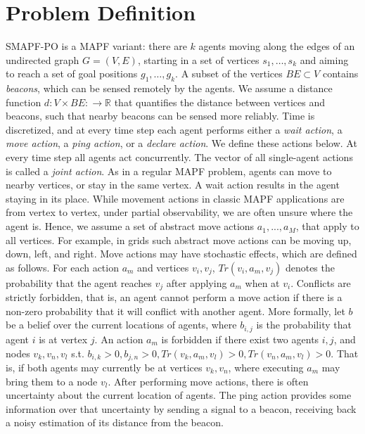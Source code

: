 \documentclass[letterpaper]{article} %
\begin{document}
\section{Problem Definition}
SMAPF-PO is a MAPF variant: there are $k$ agents moving along the edges of an undirected graph $G=(V,E)$, starting in a set of vertices $s_1,\ldots, s_k$ and
aiming to reach a set of goal positions $g_1,\ldots, g_k$.
A subset of the vertices $BE\subset V$ contains \emph{beacons}, which can be sensed remotely by the agents.
We assume a distance function $d:V\times BE:\rightarrow\mathbb{R}$ that quantifies the distance between vertices and beacons, such that nearby beacons can be sensed more reliably. Time is discretized, and at every time step each agent performs either a \emph{wait action}, a \emph{move action}, a \emph{ping action}, or a \emph{declare action}. We define these actions below.
At every time step all agents act concurrently. The vector of all single-agent actions is called a \emph{joint action}.
 As in a regular MAPF problem, agents can move to nearby vertices, or stay in the same vertex.
A wait action results in the agent staying in its place.
While movement actions in classic MAPF applications are from vertex to vertex, under partial observability, we are often unsure where the agent is. Hence, we assume a set of abstract move actions $a_1,...,a_M$, that apply to all vertices.
For example, in grids such abstract move actions can be moving up, down, left, and right.
Move actions may have stochastic effects, which are defined as follows.
For each action $a_m$ and vertices $v_i,v_j$, $Tr(v_i,a_m,v_j)$ denotes the probability that the agent reaches $v_j$ after applying $a_m$ when at $v_i$.
Conflicts are strictly forbidden, that is, an agent cannot perform a move action if there is a non-zero probability that it will conflict with another agent.  More formally, let $b$ be a belief over the current locations of agents, where $b_{i,j}$ is the probability that agent $i$ is at vertex $j$.
An action $a_m$ is forbidden if there exist two agents $i,j$, and nodes $v_{k},v_{n},v_{l}$ s.t.
$b_{i,k}>0, b_{j,n}>0, Tr(v_k,a_m,v_l)>0, Tr(v_n,a_m,v_l)>0 $. That is, if both agents may currently be at vertices $v_k,v_n$, where executing $a_m$ may bring them to a node $v_l$.
 After performing move actions, there is often uncertainty about the current location of agents. The ping action provides some information over that uncertainty by sending a signal to a beacon, receiving back a noisy estimation of its distance from the beacon.
\end{document}
